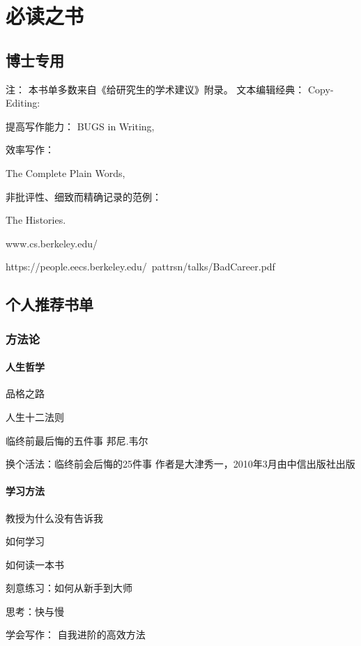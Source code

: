 \chapter{必读之书}


\section{博士专用}

注： 本书单多数来自《给研究生的学术建议》附录。
文本编辑经典：
Copy-Editing:

提高写作能力：
BUGS in Writing,

效率写作：

The Complete Plain Words,

非批评性、细致而精确记录的范例：

The Histories. 

www.cs.berkeley.edu/%

https://people.eecs.berkeley.edu/~pattrsn/talks/BadCareer.pdf


\section{个人推荐书单}


\subsection{方法论}

\subsubsection{人生哲学}

品格之路

人生十二法则

临终前最后悔的五件事    邦尼.韦尔

换个活法：临终前会后悔的25件事
作者是大津秀一，2010年3月由中信出版社出版

\subsubsection{学习方法}

教授为什么没有告诉我

如何学习

如何读一本书

刻意练习：如何从新手到大师

思考：快与慢

学会写作： 自我进阶的高效方法

